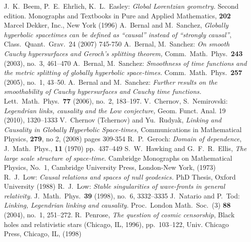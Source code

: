 \documentclass[12pt,reqno,a4paper]{amsart}
\begin{document}
\begin{thebibliography}{99}
J.~K.~Beem, P.~E.~Ehrlich, K.~L.~Easley: {\em Global Lorentzian
geometry.\/} Second edition. Monographs and Textbooks in Pure and
Applied Mathematics, {\bf 202\/} Marcel Dekker, Inc., New York (1996)
A.~Bernal and M.~Sanchez, {\it Globally hyperbolic spacetimes can be defined as ``causal'' instead of
``strongly causal''},  Class.~Quant.~Grav.~24 (2007) 745-750
A.~Bernal, M.~Sanchez: {\em On smooth Cauchy hypersurfaces and
Geroch's splitting theorem, \/} Comm.~Math.~Phys.~{\bf 243\/}
(2003), no.~3, 461--470
A.~Bernal, M.~Sanchez: {\em Smoothness of time functions and the
metric splitting of globally hyperbolic space-times.\/} Comm.~Math.~Phys.~{\bf 257} (2005), no.~1, 43--50.
A.~Bernal and M.~Sanchez: {\em Further results on the smoothability
of Cauchy hypersurfaces and Cauchy time functions.\/} Lett.~Math.~Phys.~{\bf 77} (2006), no.~2, 183--197.
V.~Chernov, S.~Nemirovski: {\em Legendrian links, causality and the Low conjecture,\/} Geom. Funct. Anal. 19 (2010), 1320--1333
V.~Chernov (Tchernov) and Yu.~Rudyak, {\it Linking and Causality in Globally Hyperbolic Space-times,\/}
Communications in Mathematical Physics, {\bf 279}, no 2, (2008) pages 309-354
R.~P.~Geroch: {\em Domain of dependence\/}, J.~Math.~Phys., {\bf 11}
(1970) pp.~437--449
S.~W.~Hawking and G.~F.~R.~Ellis, {\em The large scale structure of
space-time.\/} Cambridge Monographs on Mathematical Physics, No.~1,
Cambridge University Press, London-New York, (1973)
R.~J.~Low: {\em Causal relations and spaces of null geodesics.\/}
PhD Thesis, Oxford University (1988)
R.~J.~Low: {\em Stable singularities of wave-fronts in general relativity.\/} J.~Math.~Phys.~{\bf 39} (1998), no.~6, 3332--3335
J.~Natario and P.~Tod: {\em Linking, Legendrian linking and
causality.\/} Proc.~London Math.~Soc.~(3) {\bf 88} (2004), no.~1,
251--272.
R.~Penrose, {\it The question of cosmic censorship},
Black holes and relativistic stars (Chicago, IL, 1996), pp.~103--122,
Univ. Chicago Press, Chicago, IL, (1998)
\end{thebibliography}
\end{document}

